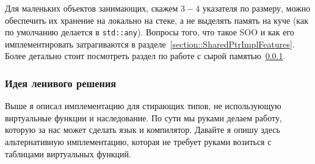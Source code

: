 Для маленьких объектов занимающих, скажем $3-4$ указателя по размеру, можно обеспечить их хранение на локально на стеке, а не выделять память на куче (как по умолчанию делается в \verb"std::any").
Вопросы того, что такое SOO и как его имплементировать затрагиваются в разделе~\ref{section::SharedPtrImplFeatures}.
Более детально стоит посмотреть раздел по работе с сырой памятью~\ref{}.

\subsubsection{Идея ленивого решения}

Выше я описал имплементацию для стирающих типов, не использующую виртуальные функции и наследование.
По сути мы руками делаем работу, которую за нас может сделать язык и компилятор.
Давайте я опишу здесь альтернативную имплементацию, которая не требует руками возиться с таблицами виртуальных функций.

